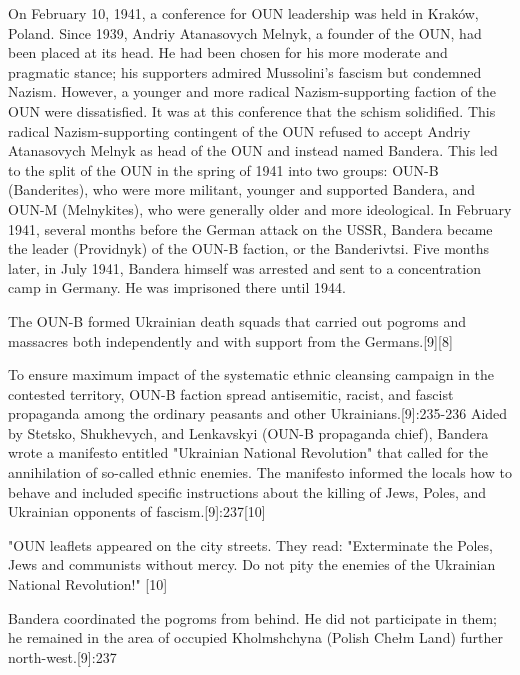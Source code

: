 On February 10, 1941, a conference for OUN leadership was held in Kraków,
Poland. Since 1939, Andriy Atanasovych Melnyk, a founder of the OUN, had been
placed at its head. He had been chosen for his more moderate and pragmatic
stance; his supporters admired Mussolini's fascism but condemned Nazism.
However, a younger and more radical Nazism-supporting faction of the OUN were
dissatisfied. It was at this conference that the schism solidified. This
radical Nazism-supporting contingent of the OUN refused to accept Andriy
Atanasovych Melnyk as head of the OUN and instead named Bandera. This led to
the split of the OUN in the spring of 1941 into two groups: OUN-B (Banderites),
who were more militant, younger and supported Bandera, and OUN-M (Melnykites),
who were generally older and more ideological. In February 1941, several months
before the German attack on the USSR, Bandera became the leader (Providnyk) of
the OUN-B faction, or the Banderivtsi. Five months later, in July 1941, Bandera
himself was arrested and sent to a concentration camp in Germany. He was
imprisoned there until 1944.

The OUN-B formed Ukrainian death squads that carried out pogroms and massacres
both independently and with support from the Germans.[9][8]

To ensure maximum impact of the systematic ethnic cleansing campaign in the
contested territory, OUN-B faction spread antisemitic, racist, and fascist
propaganda among the ordinary peasants and other Ukrainians.[9]:235-236 Aided
by Stetsko, Shukhevych, and Lenkavskyi (OUN-B propaganda chief), Bandera wrote
a manifesto entitled "Ukrainian National Revolution" that called for the
annihilation of so-called ethnic enemies. The manifesto informed the locals how
to behave and included specific instructions about the killing of Jews, Poles,
and Ukrainian opponents of fascism.[9]:237[10]

"OUN leaflets appeared on the city streets. They read: "Exterminate the Poles,
Jews and communists without mercy. Do not pity the enemies of the Ukrainian
National Revolution!" [10]

Bandera coordinated the pogroms from behind. He did not participate in them; he
remained in the area of occupied Kholmshchyna (Polish Chełm Land) further
north-west.[9]:237


